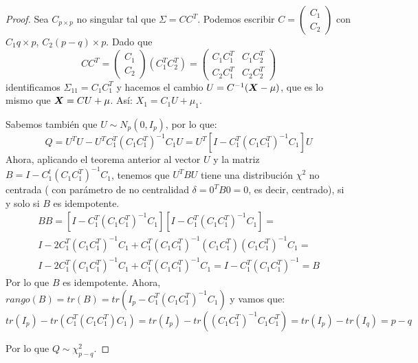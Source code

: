 \begin{proof}
  Sea $C_{p\times p}$ no singular tal que $\Sigma = CC^T$. Podemos escribir $C = \begin{pmatrix}C_1 \\ C_2 \end{pmatrix}$ con $C_1 q\times p$, $C_2 (p-q)\times p$. Dado que
  \[
  CC^T = \begin{pmatrix} C_1 \\ C_2 \end{pmatrix}(C_1^T C_2^T) = \begin{pmatrix} C_1C_1^T & C_1C_2^T \\ C_2C_1^T & C_2C_2^T\end{pmatrix}
    \]
    identificamos $\Sigma_{11} = C_1C_1^T$ y hacemos el cambio $U = C^{-1}(\boldsymbol{X} - \mu)$, que es lo mismo que $\boldsymbol{X} = CU + \mu$. Así: $X_1 = C_1U + \mu_1$.

    Sabemos también que $U \sim N_p(0,I_p)$, por lo que:
    \[
    Q = U^T U - U^TC_1^T(C_1C_1^T)^{-1}C_1U = U^T [I - C_1^T(C_1C_1^T)^{-1}C_1]U
    \]
    Ahora, aplicando el teorema anterior al vector $U$ y la matriz $B = I - C_1^t(C_1C_1^T)^{-1}C_1$, tenemos que $U^TBU$ tiene una distribución $\chi^2$ no centrada ( con parámetro de no centralidad $\delta = 0^TB0=0$, es decir, centrado), si y solo si $B$ es idempotente.
    \[
    \begin{aligned}
      BB = [I - C_1^T(C_1 C_1^T)^{-1}C_1][I - C_1^T(C_1 C_1^T)^{-1}C_1] = \\
      I - 2C_1^T(C_1C_1^T)^{-1}C_1 + C_1^T(C_1C_1^T)^{-1}(C_1C_1^T)(C_1C_1^T)^{-1}C_1 = \\
      I - 2C_1^T(C_1C_1^T)^{-1}C_1 + C_1^T( C_1C_1^T)^{-1}C_1 =  I - C_1^T(C_1C_1^T)^{-1} = B
      \end{aligned}
    \]
    Por lo que $B$ es idempotente. Ahora, $rango(B) = tr(B) = tr(I_p - C_1^T(C_1C_1^T)^{-1}C_1)$ y vamos que:
    \[
    tr(I_p) - tr(C_1^T(C_1C_1^T)C_1) = tr(I_p) - tr((C_1C_1^T)^{-1}C_1C_1^T) = tr(I_p) - tr(I_q) = p-q
    \]
    
    Por lo que $Q \sim \chi_{p - q}^2$.
\end{proof}

